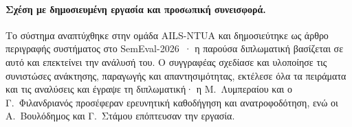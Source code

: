 \paragraph{Σχέση με δημοσιευμένη εργασία και προσωπική συνεισφορά.}
Το σύστημα αναπτύχθηκε στην ομάδα AILS-NTUA και δημοσιεύτηκε ως άρθρο περιγραφής συστήματος στο SemEval-2026~\citep{athanasiou2026ailsntua}· η παρούσα διπλωματική βασίζεται σε αυτό και επεκτείνει την ανάλυσή του. Ο συγγραφέας σχεδίασε και υλοποίησε τις συνιστώσες ανάκτησης, παραγωγής και απαντησιμότητας, εκτέλεσε όλα τα πειράματα και τις αναλύσεις και έγραψε τη διπλωματική· η Μ.~Λυμπεραίου και ο Γ.~Φιλανδριανός προσέφεραν ερευνητική καθοδήγηση και ανατροφοδότηση, ενώ οι Α.~Βουλόδημος και Γ.~Στάμου επόπτευσαν την εργασία.





